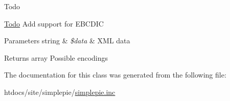 \begin{DoxyRefDesc}{Todo}
\item[\hyperlink{todo__todo000027}{Todo}]Add support for E\-B\-C\-D\-I\-C \end{DoxyRefDesc}

\begin{DoxyParams}[1]{Parameters}
string & {\em \$data} & X\-M\-L data \\
\hline
\end{DoxyParams}
\begin{DoxyReturn}{Returns}
array Possible encodings 
\end{DoxyReturn}


The documentation for this class was generated from the following file\-:\begin{DoxyCompactItemize}
\item 
htdocs/site/simplepie/\hyperlink{simplepie_8inc}{simplepie.\-inc}\end{DoxyCompactItemize}
